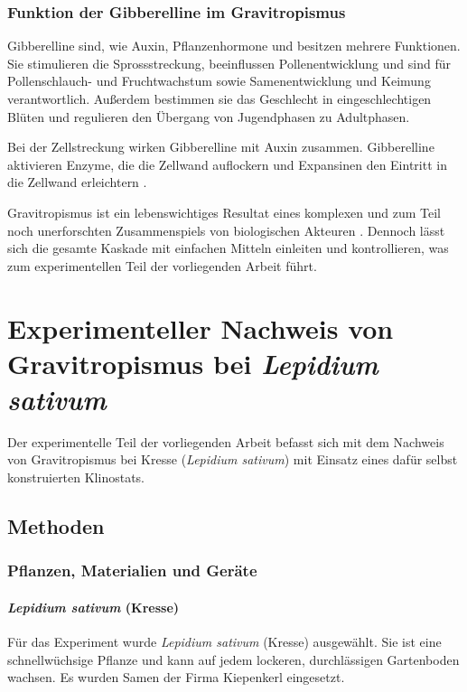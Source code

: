 \documentclass[
11pt, 
ngerman,
listof=totocnumbered,
oneside,
bibliography=totocnumbered,
abstracton
]{scrreprt}
\begin{document}
\subsection{Funktion der Gibberelline im Gravitropismus}

Gibberelline sind, wie Auxin, Pflanzenhormone und besitzen mehrere Funktionen. Sie stimulieren die Sprossstreckung, beeinflussen Pollenentwicklung und sind für Pollenschlauch- und Fruchtwachstum sowie Samenentwicklung und Keimung verantwortlich. Außerdem bestimmen sie das Geschlecht in eingeschlechtigen Blüten und regulieren den Übergang von Jugendphasen zu Adultphasen. 

Bei der Zellstreckung wirken Gibberelline mit Auxin zusammen. Gibberelline aktivieren Enzyme, die die Zellwand auflockern und Expansinen den Eintritt in die Zellwand erleichtern \parencite[1122--1123]{campbell}.

Gravitropismus ist ein lebenswichtiges Resultat eines komplexen und zum Teil noch unerforschten Zusammenspiels von biologischen Akteuren \parencite[531]{Luettge}. Dennoch lässt sich die gesamte Kaskade mit einfachen Mitteln einleiten und kontrollieren, was zum experimentellen Teil der vorliegenden Arbeit führt. 

\chapter{Experimenteller Nachweis von Gravitropismus bei \emph{Lepidium sativum}}

Der experimentelle Teil der vorliegenden Arbeit befasst sich mit dem Nachweis von Gravitropismus bei Kresse (\emph{Lepidium sativum}) mit Einsatz eines dafür selbst konstruierten Klinostats. 

\section{Methoden}

\subsection{Pflanzen, Materialien und Geräte}

\subsubsection{\emph{Lepidium sativum} (Kresse)}

Für das Experiment wurde \emph{Lepidium sativum} (Kresse) ausgewählt. Sie ist eine schnellwüchsige Pflanze und kann auf jedem lockeren, durchlässigen Gartenboden wachsen. Es wurden Samen der Firma Kiepenkerl eingesetzt. 
\end{document}
